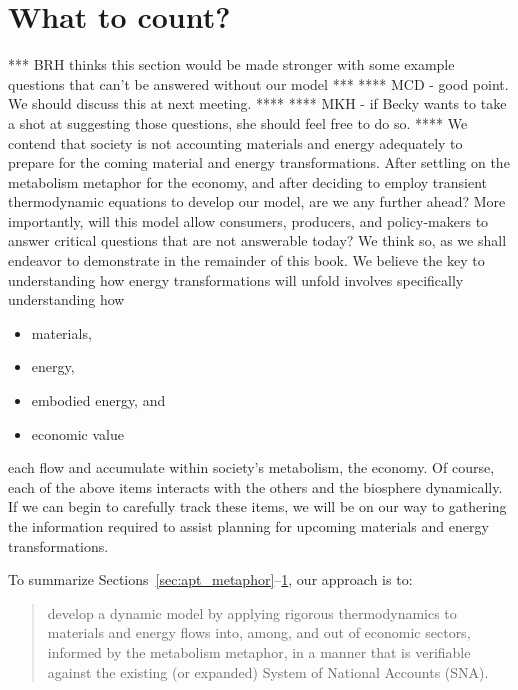 \section{What to count?}
\label{sec:what_to_count}
*** BRH thinks this section would be made stronger with 
some example questions that can't be answered without our model ***
**** MCD - good point. We should discuss this at next meeting. ****
**** MKH - if Becky wants to take a shot at suggesting those questions, 
she should feel free to do so. ****
We contend that society is not accounting materials and energy adequately 
to prepare for the coming material and energy transformations.
After settling on the metabolism metaphor for the economy, 
and after deciding to employ transient thermodynamic equations to develop our model, 
are we any further ahead?
More importantly, will this model allow consumers, producers,
and policy-makers to answer critical questions that are not
answerable today? 
We think so, as we shall endeavor to demonstrate in the remainder of this book.
We believe the key to understanding how energy transformations will unfold
involves specifically understanding how

\begin{itemize}
	\item{materials,}
	\item{energy,}
	\item{embodied energy, and}
	\item{economic value}
\end{itemize}

\noindent{}each flow and accumulate within society's metabolism, the economy.
Of course, each of the above items interacts with the others 
and the biosphere dynamically.
If we can begin to carefully track these items, 
we will be on our way to gathering the information required to 
assist planning for upcoming materials and energy transformations.

To summarize Sections~\ref{sec:apt_metaphor}--\ref{sec:what_to_count}, 
our approach is to:

\begin{framed}
	\begin{quote}
	\begin{normalsize}
		develop a dynamic model 
		by applying rigorous thermodynamics 
		to materials and energy flows into, among, 
		and out of economic sectors,
		informed by the metabolism metaphor,
		in a manner that is verifiable against 
		the existing (or expanded) 
		System of National Accounts (SNA).
	\end{normalsize}
	\end{quote}
\end{framed}


